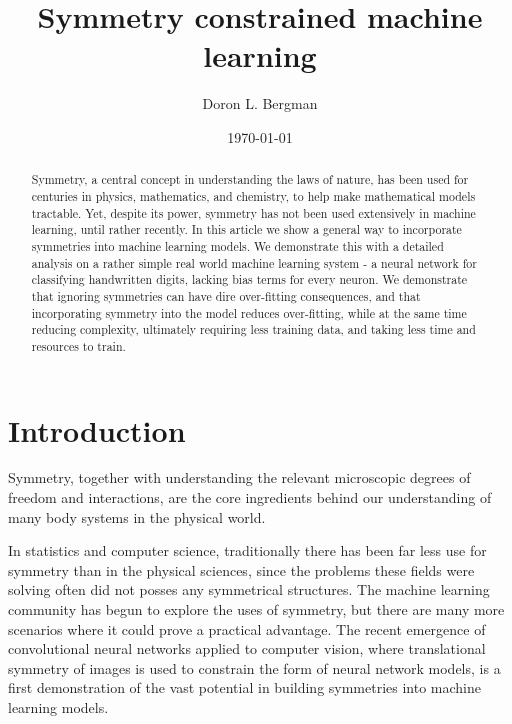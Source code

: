 \documentclass[twocolumn, nofootinbib, aps, prb]{revtex4-1}
\begin{document}
\newcommand{\be}{\begin{equation}}
\newcommand{\ee}{\end{equation}}


\title{Symmetry constrained machine learning}
\date{\today}

\author{Doron L. Bergman}

\begin{abstract}
Symmetry, a central concept in understanding the laws of nature, has been used for centuries in physics, mathematics, and chemistry, to help make mathematical models tractable. Yet, despite its power, symmetry has not been used extensively in machine learning, until rather recently. In this article we show a general way to incorporate symmetries into machine learning models. We demonstrate this with a detailed analysis on a rather simple real world machine learning system - a neural network for classifying handwritten digits, lacking bias terms for every neuron. We demonstrate that ignoring symmetries can have dire over-fitting consequences, and that incorporating symmetry into the model reduces over-fitting, while at the same time reducing complexity, ultimately requiring less training data, and taking less time and resources to train.
\end{abstract}

\maketitle


\section{Introduction}
\label{Sec:Intro}


Symmetry, together with understanding the relevant microscopic degrees of freedom and interactions, are the core ingredients behind our understanding of many body systems in the physical world.


In statistics and computer science, traditionally there has been far less use for symmetry than in the physical sciences,
since the problems these fields were solving often did not posses any symmetrical structures. The machine learning community has begun to explore the uses of symmetry, but there are many more scenarios where it could prove a practical advantage. The recent emergence of convolutional neural networks applied to computer vision\cite{lecun1989generalization, lecun1999object, lecun1990handwritten, lecun1998gradient, krizhevsky2012imagenet, lee2009convolutional, lecun2015deep}, where translational symmetry of images is used to constrain the form of neural network models, is a first demonstration of the vast potential in building symmetries into machine learning models.
\end{document}
